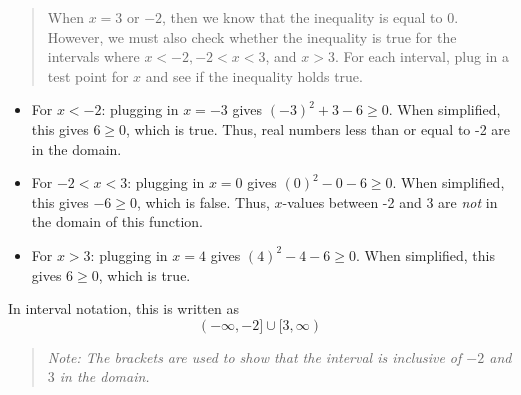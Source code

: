 \documentclass[10pt]{article}
\begin{document}
    \begin{quote} 
     When $x = 3$ or $-2$, then we know that the inequality is equal to 0. However, we must also check whether the inequality is true for the intervals where $x < -2, -2 < x<3$, and $x > 3$. For each interval, plug in a test point for $x$ and see if the inequality holds true.
    \end{quote}
    \begin{itemize}
        \item For $x < -2$: plugging in $x = -3$ gives $(-3)^2+ 3 -6 \geq 0$. When simplified, this gives $ 6 \geq 0$, which is true. Thus, real numbers less than or equal to -2 are in the domain.
        \item For $-2 < x < 3$: plugging in $x = 0$ gives $(0)^2 - 0 -6 \geq 0$. When simplified, this gives $ -6 \geq 0$, which is false. Thus,  $x$-values between -2 and 3 are \textit{not} in the domain of this function.
        \item For $x > 3$: plugging in $x = 4$ gives $(4)^2 - 4 -6 \geq 0$. When simplified, this gives $ 6 \geq 0$, which is true.
    \end{itemize}
    
    In interval notation, this is written as $$(-\infty, -2]\cup[3, \infty)$$

    \begin{quote} 
    \textit{Note: The brackets are used to show that the interval is inclusive of $-2$ and $3$ in the domain.}
    \end{quote}
\end{document}
